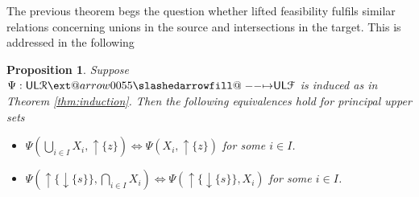 \documentclass[12pt]{article}
\makeatletter
\theoremstyle{definition}
\theoremstyle{plain}
\theoremstyle{plain}
\newtheorem{proposition}[definition]{Proposition}
\theoremstyle{plain}
\theoremstyle{plain}
\theoremstyle{remark}
\theoremstyle{remark}
\newcommand{\mc}[1]{\mathcal{#1}}
\newcommand{\low}{\mathsf{L}}
\newcommand{\upper}{\mathsf{U}}
\newcommand{\upc}[1]{{\uparrow #1}}
\newcommand{\lwc}[1]{{\downarrow #1}}
\def\slashedarrowfill@#1#2#3#4#5{%
	$\m@th\thickmuskip0mu\medmuskip\thickmuskip\thinmuskip\thickmuskip
	\relax#5#1\mkern-7mu%
	\cleaders\hbox{$#5\mkern-2mu#2\mkern-2mu$}\hfill
	\mathclap{#3}\mathclap{#2}%
	\cleaders\hbox{$#5\mkern-2mu#2\mkern-2mu$}\hfill
	\mkern-7mu#4$%
}
\def\rightslashedarrowfill@{%
	\slashedarrowfill@\relbar\relbar\mapstochar\rightarrow}
\newcommand\xslashedrightarrow[2][]{%
	\ext@arrow 0055{\rightslashedarrowfill@}{#1}{#2}}
\makeatother
\begin{document}
The previous theorem begs the question whether lifted feasibility fulfils similar relations concerning unions in the source and intersections in the target. This is addressed in the following
\begin{proposition}\label{prop:union intersection}
	Suppose $\Psi: \upper\low\mc{R} \xslashedrightarrow{} \upper\low\mc{F}$ is induced as in Theorem \ref{thm:induction}. Then the following equivalences hold for principal upper sets 
	\begin{itemize}
		\item[(i)] $\Psi(\bigcup_{i \in I} X_i, \upc{\{z\}}) \Leftrightarrow \Psi(X_i,\upc{\{z\}})$ for some $i \in I$.
		\item[(ii)] $\Psi(\upc{\{\lwc{\{s\}}\}}, \bigcap_{i \in I}X_i) \Leftrightarrow \Psi(\upc{\{\lwc{\{s\}}\}},X_i)$ for some $i \in I$.
	\end{itemize}
\end{proposition}
\end{document}
